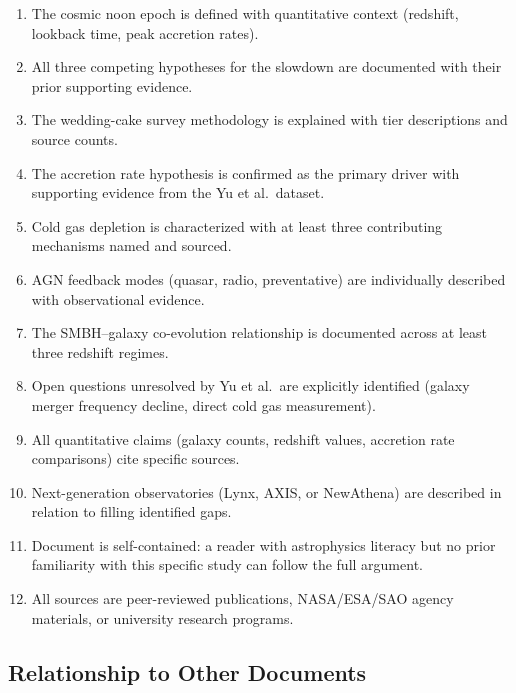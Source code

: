 \documentclass[11pt,letterpaper]{article}
\begin{document}
\begin{enumerate}[label=\textbf{SC-\arabic*:}]
  \item The cosmic noon epoch is defined with quantitative context (redshift, lookback time, peak accretion rates).
  \item All three competing hypotheses for the slowdown are documented with their prior supporting evidence.
  \item The wedding-cake survey methodology is explained with tier descriptions and source counts.
  \item The accretion rate hypothesis is confirmed as the primary driver with supporting evidence from the Yu et al.\ dataset.
  \item Cold gas depletion is characterized with at least three contributing mechanisms named and sourced.
  \item AGN feedback modes (quasar, radio, preventative) are individually described with observational evidence.
  \item The SMBH--galaxy co-evolution relationship is documented across at least three redshift regimes.
  \item Open questions unresolved by Yu et al.\ are explicitly identified (galaxy merger frequency decline, direct cold gas measurement).
  \item All quantitative claims (galaxy counts, redshift values, accretion rate comparisons) cite specific sources.
  \item Next-generation observatories (Lynx, AXIS, or NewAthena) are described in relation to filling identified gaps.
  \item Document is self-contained: a reader with astrophysics literacy but no prior familiarity with this specific study can follow the full argument.
  \item All sources are peer-reviewed publications, NASA/ESA/SAO agency materials, or university research programs.
\end{enumerate}

\subsection{Relationship to Other Documents}
\end{document}
